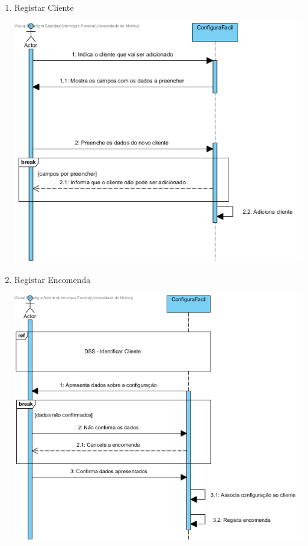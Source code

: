 \documentclass[11pt]{article} %
\begin{document}
\begin{enumerate}
\begin{center}
		\end{center}
	\item Registar Cliente
		\begin{center}
 			\includegraphics[width = 6in]{dss_registar_cliente.png}
		\end{center}
	\item Registar Encomenda
		\begin{center}
 			\includegraphics[width = 6in]{dss_registar_encomenda.png}
		\end{center}

\end{enumerate}
\end{document}
